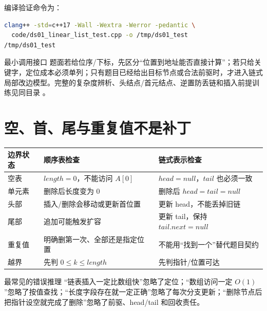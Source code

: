 \documentclass[UTF8,fontset=none,11pt,a4paper]{ctexart}
\begin{document}
编译验证命令为：
\begin{lstlisting}[language=bash]
clang++ -std=c++17 -Wall -Wextra -Werror -pedantic \
  code/ds01_linear_list_test.cpp -o /tmp/ds01_test
/tmp/ds01_test
\end{lstlisting}

\begin{methodbox}{最小调用接口}
题面若给位序/下标，先区分“位置到地址能否直接计算”；若只给关键字，定位成本必须单列；只有题目已经给出目标节点或合法前驱时，才进入链式局部改边模型。完整的复杂度辨析、头结点/首元结点、逆置防丢链和插入前提训练见同目录 。
\end{methodbox}

\section{空、首、尾与重复值不是补丁}
\begin{center}\small
\begin{tabularx}{\linewidth}{L{2.2cm}YY}
\toprule
边界状态 & 顺序表检查 & 链式表示检查\\
\midrule
空表 & $length=0$，不能访问 $A[0]$ & $head=null$，$tail$ 也必须一致\\
单元素 & 删除后长度变为 0 & 删除后 $head=tail=null$\\
头部 & 插入/删除会移动或更新首位置 & 更新 head，不能丢掉旧链\\
尾部 & 追加可能触发扩容 & 更新 tail，保持 $tail.next=null$\\
重复值 & 明确删第一次、全部还是指定位置 & 不能用“找到一个”替代题目契约\\
越界 & 先判 $0\le k\le length$ & 先判指针/位置可达\\
\bottomrule
\end{tabularx}\end{center}

\begin{warnbox}{最常见的错误推理}
“链表插入一定比数组快”忽略了定位；“数组访问一定 $O(1)$”忽略了按值查找；“长度字段存在就一定正确”忽略了每次分支更新；“删除节点后把指针设空就完成了删除”忽略了前驱、head/tail 和回收责任。
\end{warnbox}
\end{document}
